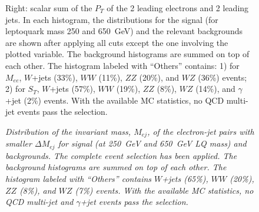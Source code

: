 \begin{figure}[htbp]
\begin{center}
{             Right: scalar sum of the $P_T$ of the 2 leading electrons and 2 leading jets. 
	     In each histogram, the distributions for the signal (for leptoquark mass 250 and 650~GeV) and the 
	     relevant backgrounds are shown after applying all cuts except the one involving the 
	     plotted variable. 
	     The background histograms are summed on top of each other.
	     The histogram labeled with ``Others'' contains: 1) for $M_{ee}$, $W$+jets (33\%), 
	     $WW$ (11\%), $ZZ$ (20\%), and $WZ$ (36\%) events; 2) for $S_{T}$, $W$+jets (57\%), 
	     $WW$ (19\%), $ZZ$ (8\%), $WZ$ (14\%), and $\gamma$+jet (2\%) events.
	     With the available MC statistics, no QCD multi-jet events pass 
	     the selection.}
    \label{fig:Mee_St_distributions}
  \end{center}
\end{figure}


\begin{figure}[htbp]
  \begin{center}
    \caption{\small \sl Distribution of the invariant mass, $M_{ej}$, 
      of the electron-jet pairs 
      with smaller $\Delta M_{ej}$
      for signal (at 250~GeV and 650~GeV LQ mass) and backgrounds. 
      The complete event selection has been applied.
      The background histograms are summed on top of each other.
      The histogram labeled with ``Others'' contains $W$+jets (65\%), 
      $WW$ (20\%), $ZZ$ (8\%), and $WZ$ (7\%) events. 
      With the available MC statistics, no QCD multi-jet and $\gamma$+jet events pass 
      the selection.}
    \label{fig:Mej_allComb}
  \end{center}
\end{figure}


